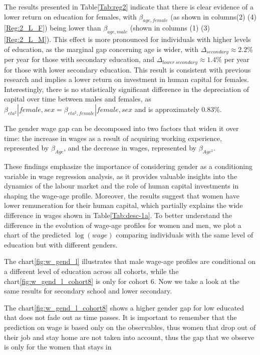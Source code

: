 \documentclass[12pt]{article}
\begin{document}
The results presented in Table\ref{Tab:reg2} indicate that there is clear evidence of a lower return on education for
females, with $\beta_{age, female}$ (as shown in columns(2) (4)\ref{Reg:2_L_F}) being lower than
$\beta_{age,male}$ (shown in columns (1) (3)\ref{Reg:2_L_M}). This effect is more pronounced for individuals with
higher levels of education, as the marginal gap concerning age is wider, with $\Delta_{secondary} \approx 2.2\%$
per year for those with secondary education, and $\Delta_{lower\ secondary} \approx 1.4\%$ per year for those with lower
secondary education. This result is consistent with previous research \citet{erosa2012human} and implies a lower return
on investment in human capital for females. Interestingly, there is no statistically significant difference in the
depreciation of capital over time between males and females, as $\beta_{eta^2}|female, sex = \beta_{eta^2,
female}|female,sex$ and is approximately $0.83\%$.
\par
The gender wage gap can be decomposed into two factors that widen it over time: the increase in wages as a result of
acquiring working experience, represented by $\beta_{Age}$, and the decrease in wages, represented by $\beta_{Age^2}$.
\par
These findings emphasize the importance of considering gender as a conditioning variable in wage regression analysis, as
it provides valuable insights into the dynamics of the labour market and the role of human capital investments in shaping
the wage-age profile. Moreover, the results suggest that women have lower remuneration for their human capital, which
partially explains the wide difference in wages shown in Table\ref{Tab:desc-1a}. To better understand the difference in
the evolution of wage-age profiles for women and men, we plot a chart of the predicted $\log(wage)$ comparing
individuals with the same level of education but with different genders.
\par
The chart\ref{fig:w_gend_l} illustrates that male wage-age profiles are conditional on a different level of education across
all cohorts, while the chart\ref{fig:w_gend_l_cohort8} is only for cohort 6. Now we take a look at the same results for
secondary school and lower secondary. 
\par
The chart\ref{fig:w_gend_l_cohort8} shows a higher gender gap for low educated that does not fade out as time
passes. It is important to remember that the prediction on wage is based only on the observables, thus women that drop
out of their job and stay home are not taken into account, thus the gap that we observe is only for the women that stays in
\end{document}
